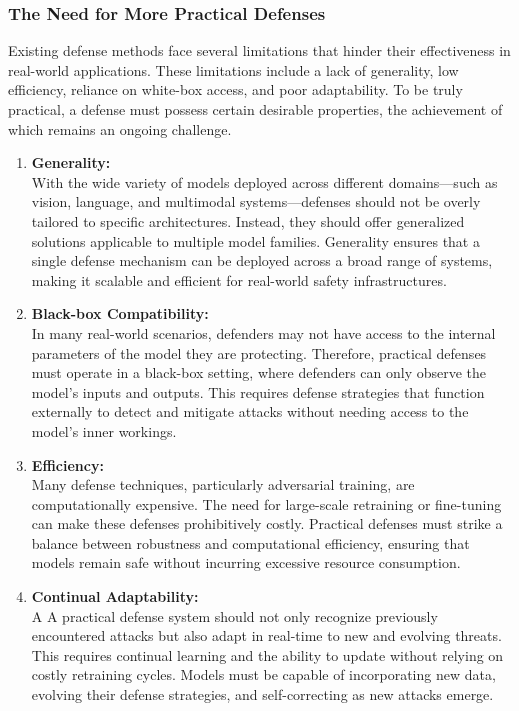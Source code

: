 \subsubsection{The Need for More Practical Defenses}

Existing defense methods face several limitations that hinder their effectiveness in real-world applications. These limitations include a lack of generality, low efficiency, reliance on white-box access, and poor adaptability. To be truly practical, a defense must possess certain desirable properties, the achievement of which remains an ongoing challenge.

\begin{enumerate}[label=\arabic*]
    \item \textbf{Generality:} \\With the wide variety of models deployed across different domains—such as vision, language, and multimodal systems—defenses should not be overly tailored to specific architectures. Instead, they should offer generalized solutions applicable to multiple model families. Generality ensures that a single defense mechanism can be deployed across a broad range of systems, making it scalable and efficient for real-world safety infrastructures.
    \item \textbf{Black-box Compatibility:} \\In many real-world scenarios, defenders may not have access to the internal parameters of the model they are protecting. Therefore, practical defenses must operate in a black-box setting, where defenders can only observe the model’s inputs and outputs. This requires defense strategies that function externally to detect and mitigate attacks without needing access to the model's inner workings.
    \item \textbf{Efficiency:} \\ Many defense techniques, particularly adversarial training, are computationally expensive. The need for large-scale retraining or fine-tuning can make these defenses prohibitively costly. Practical defenses must strike a balance between robustness and computational efficiency, ensuring that models remain safe without incurring excessive resource consumption.

    \item \textbf{Continual Adaptability:} \\ A A practical defense system should not only recognize previously encountered attacks but also adapt in real-time to new and evolving threats. This requires continual learning and the ability to update without relying on costly retraining cycles. Models must be capable of incorporating new data, evolving their defense strategies, and self-correcting as new attacks emerge.
\end{enumerate}

